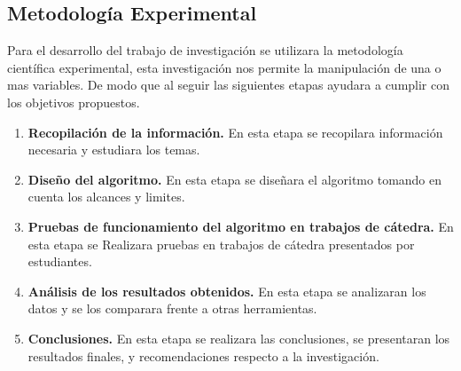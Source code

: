 \subsection{Metodología Experimental}
Para el desarrollo del trabajo de investigación se utilizara la metodología científica experimental, esta investigación
nos permite la manipulación de una o mas variables. De modo que al seguir las siguientes etapas ayudara a cumplir con los objetivos propuestos.
\begin{enumerate}
  \item \textbf{Recopilación de la información.} En esta etapa se recopilara información necesaria y estudiara los temas.
  \item \textbf{Diseño del algoritmo.} En esta etapa se diseñara el algoritmo tomando en cuenta los alcances y limites.
  \item \textbf{Pruebas de funcionamiento del algoritmo en trabajos de cátedra.} En esta etapa se Realizara pruebas en trabajos de cátedra presentados por estudiantes.
  \item \textbf{Análisis de los resultados obtenidos.} En esta etapa se analizaran los datos y se los comparara frente a otras herramientas.
  \item \textbf{Conclusiones.} En esta etapa se realizara las conclusiones, se presentaran los resultados finales, y recomendaciones respecto a la investigación.
\end{enumerate}
